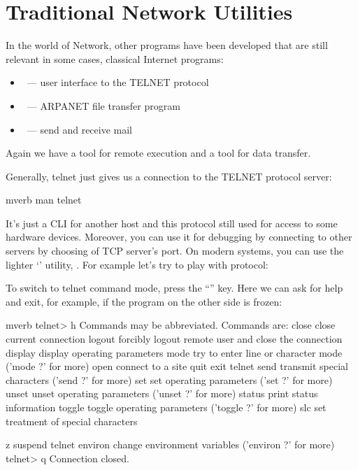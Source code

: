 \section*{Traditional Network Utilities} %

In the world of  Network, other programs have been developed that
are still relevant in some cases, classical Internet programs:
\begin{itemize}
\item {}~--- user interface to the TELNET protocol
\item {}~--- ARPANET file transfer program
\item {}~--- send and receive mail
\end{itemize}
Again we have a tool for remote execution and a tool for data transfer.

Generally, telnet just gives us a connection to the TELNET protocol server:
\begin{code}{mverb}
man telnet
\end{code}
It's just a CLI for another host and this protocol still used for access
to some hardware devices. Moreover, you can use it for debugging by connecting
to other servers by choosing of TCP server's port. On modern systems,
you can use the lighter `' utility, . For example let's
try to play with  protocol:
\begin{code}{mverb}
$ telnet google.com 80
Trying 173.194.73.101...
Connected to google.com.
Escape character is '^]'.
GET /index.html HTTP/1.1
\end{code} %
To switch to telnet command mode, press the ``\struct{Ctrl-]}'' key.
Here we can ask for help and exit, for example, if the program on the other
side is frozen:
\begin{code}{mverb}
telnet> h
Commands may be abbreviated.  Commands are:
close			close current connection
logout		forcibly logout remote user and close the connection
display	display operating parameters
mode				try to enter line or character mode ('mode ?' for more)
open				connect to a site
quit				exit telnet
send				transmit special characters ('send ?' for more)
set					set operating parameters ('set ?' for more)
unset			unset operating parameters ('unset ?' for more)
status		print status information
toggle		toggle operating parameters ('toggle ?' for more)
slc					set treatment of special characters

z							suspend telnet
environ	change environment variables ('environ ?' for more)
telnet> q
Connection closed.
\end{code}


